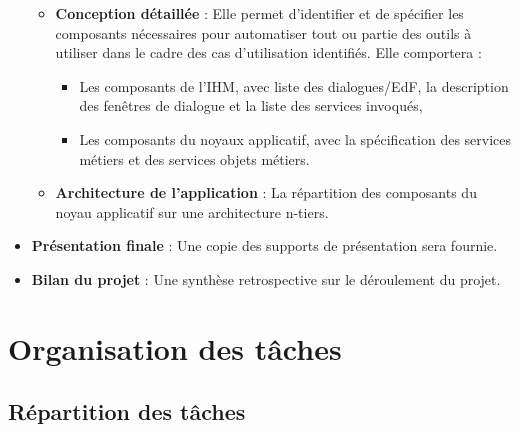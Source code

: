 \begin{itemize}
\begin{itemize}
\item \textbf{Conception détaillée} : Elle permet d'identifier et de spécifier les composants nécessaires pour automatiser tout ou partie des outils à utiliser dans le cadre des cas d'utilisation identifiés. Elle comportera :

\begin{itemize}
\item Les composants de l'IHM, avec liste des dialogues/EdF, la description des fenêtres de dialogue et la liste des services invoqués,
\item Les composants du noyaux applicatif, avec la spécification des services métiers et des services objets métiers.
\end{itemize}

\item \textbf{Architecture de l'application} : La répartition des composants du noyau applicatif sur une architecture n-tiers.
\end{itemize}

\item \textbf{Présentation finale} : Une copie des supports de présentation sera fournie.
\item \textbf{Bilan du projet} : Une synthèse retrospective sur le déroulement du projet.
\end{itemize}

\section{Organisation des tâches}

\subsection{Répartition des tâches}

